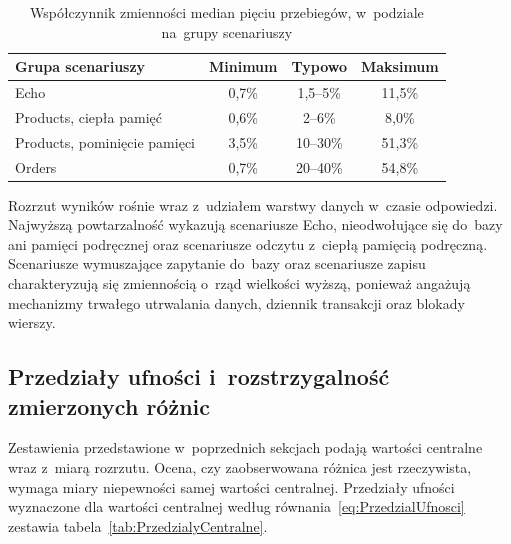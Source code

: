 \begin{table}[htb]
\centering
\footnotesize
\caption{Współczynnik zmienności median pięciu przebiegów, w~podziale na~grupy scenariuszy}
\label{tab:Zmiennosc}
\begin{tabular}{|l|c|c|c|}
\hline
\textbf{Grupa scenariuszy} & \textbf{Minimum} & \textbf{Typowo} & \textbf{Maksimum} \\
\hline
Echo                          & 0,7\% & 1,5--5\% & 11,5\% \\
Products, ciepła pamięć       & 0,6\% & 2--6\%   & 8,0\% \\
Products, pominięcie pamięci  & 3,5\% & 10--30\% & 51,3\% \\
Orders                        & 0,7\% & 20--40\% & 54,8\% \\
\hline
\end{tabular}
\end{table}

Rozrzut wyników rośnie wraz z~udziałem warstwy danych w~czasie
odpowiedzi. Najwyższą powtarzalność wykazują scenariusze
Echo, nieodwołujące się do~bazy ani pamięci podręcznej oraz scenariusze
odczytu z~ciepłą pamięcią podręczną. Scenariusze wymuszające zapytanie do~bazy
oraz scenariusze zapisu charakteryzują się zmiennością o~rząd wielkości
wyższą, ponieważ angażują mechanizmy trwałego utrwalania danych, dziennik
transakcji oraz blokady wierszy.

\subsection{Przedziały ufności i~rozstrzygalność zmierzonych różnic}
\label{subsec:WynikiPrzedzialy}

Zestawienia przedstawione w~poprzednich sekcjach podają wartości centralne wraz z~miarą rozrzutu. Ocena, czy zaobserwowana różnica jest rzeczywista, wymaga miary niepewności samej wartości centralnej. Przedziały ufności wyznaczone dla wartości centralnej według równania~\ref{eq:PrzedzialUfnosci} zestawia tabela~\ref{tab:PrzedzialyCentralne}.

